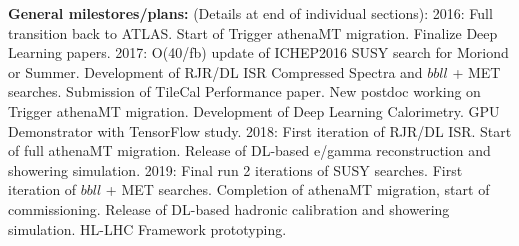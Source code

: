 

{\bf General milestores/plans:} (Details at end of individual
sections): 2016: Full transition back to ATLAS. Start of Trigger
athenaMT migration. Finalize Deep Learning papers. 2017: O(40/fb)
update of ICHEP2016 SUSY search for Moriond or Summer. Development of
RJR/DL ISR Compressed Spectra and $bbll$ + MET searches. Submission of
TileCal Performance paper. New postdoc working on Trigger athenaMT
migration. Development of Deep Learning Calorimetry. GPU Demonstrator
with TensorFlow study. 2018: First iteration of RJR/DL ISR. Start of
full athenaMT migration. Release of DL-based e/gamma reconstruction
and showering simulation.  2019: Final run 2 iterations of SUSY
searches. First iteration of $bbll$ + MET searches. Completion of
athenaMT migration, start of commissioning.  Release of DL-based
hadronic calibration and showering simulation. HL-LHC Framework
prototyping.




